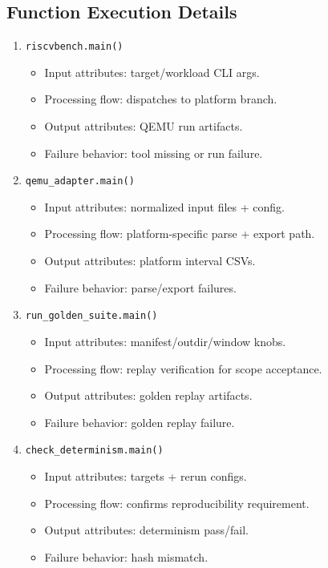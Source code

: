 \documentclass[11pt,a4paper]{article}
\begin{document}
\subsection*{Function Execution Details}
\begin{enumerate}[leftmargin=*]
  \item \texttt{riscvbench.main()}
  \begin{itemize}[leftmargin=*]
    \item Input attributes: target/workload CLI args.
    \item Processing flow: dispatches to platform branch.
    \item Output attributes: QEMU run artifacts.
    \item Failure behavior: tool missing or run failure.
  \end{itemize}
  \item \texttt{qemu\_adapter.main()}
  \begin{itemize}[leftmargin=*]
    \item Input attributes: normalized input files + config.
    \item Processing flow: platform-specific parse + export path.
    \item Output attributes: platform interval CSVs.
    \item Failure behavior: parse/export failures.
  \end{itemize}
  \item \texttt{run\_golden\_suite.main()}
  \begin{itemize}[leftmargin=*]
    \item Input attributes: manifest/outdir/window knobs.
    \item Processing flow: replay verification for scope acceptance.
    \item Output attributes: golden replay artifacts.
    \item Failure behavior: golden replay failure.
  \end{itemize}
  \item \texttt{check\_determinism.main()}
  \begin{itemize}[leftmargin=*]
    \item Input attributes: targets + rerun configs.
    \item Processing flow: confirms reproducibility requirement.
    \item Output attributes: determinism pass/fail.
    \item Failure behavior: hash mismatch.
  \end{itemize}
\end{enumerate}
\end{document}
